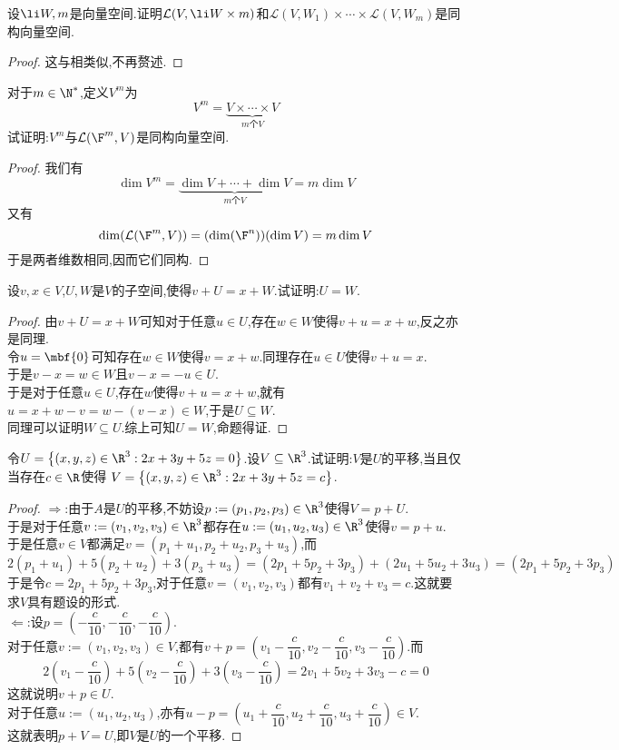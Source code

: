 \documentclass{ctexart}
\begin{document}
\begin{problem}[4.]
    设$\li W,m$是向量空间.证明$\mathcal{L}(V,\li W\times m)$和$\mathcal{L}(V,W_1)\times\cdots\times\mathcal{L}(V,W_m)$是同构向量空间.
\end{problem}
\begin{proof}
    这与相类似,不再赘述.
\end{proof}
\begin{problem}[5.]
    对于$m\in\N^*$,定义$V^m$为
    $$V^m=\underbrace{V\times\cdots\times V}_{m\text{个}V}$$
    试证明:$V^m$与$\mathcal{L}(\F^m,V)$是同构向量空间.
\end{problem}
\begin{proof}
    我们有$$\dim V^m=\underbrace{\dim V+\cdots+\dim V}_{m\text{个}V}=m\dim V$$
    又有$$\dim(\mathcal{L}(\F^m,V))=(\dim(\F^n))(\dim V)=m\dim V$$
    于是两者维数相同,因而它们同构.
\end{proof}
\begin{problem}[6.]
    设$v,x\in V$,$U,W$是$V$的子空间,使得$v+U=x+W$.试证明:$U=W$.
\end{problem}
\begin{proof}
    由$v+U=x+W$可知对于任意$u\in U$,存在$w\in W$使得$v+u=x+w$,反之亦是同理.\\
    令$u=\mbf{0}$可知存在$w\in W$使得$v=x+w$.同理存在$u\in U$使得$v+u=x$.\\
    于是$v-x=w\in W$且$v-x=-u\in U$.\\
    于是对于任意$u\in U$,存在$w$使得$v+u=x+w$,就有$u=x+w-v=w-(v-x)\in W$,于是$U\subseteq W$.\\
    同理可以证明$W\subseteq U$.综上可知$U=W$,命题得证.
\end{proof}
\begin{problem}[7.]
    令$U=\left\{(x,y,z)\in\R^3:2x+3y+5z=0\right\}$.设$V\subseteq\R^3$.试证明:$V$是$U$的平移,当且仅当存在$c\in\R$使得%
    $V=\left\{(x,y,z)\in\R^3:2x+3y+5z=c\right\}$.
\end{problem}
\begin{proof}
    $\Rightarrow$:由于$A$是$U$的平移,不妨设$p:=(p_1,p_2,p_3)\in\R^3$使得$V=p+U$.\\
    于是对于任意$v:=(v_1,v_2,v_3)\in\R^3$都存在$u:=(u_1,u_2,u_3)\in\R^3$使得$v=p+u$.\\
    于是任意$v\in V$都满足$v=(p_1+u_1,p_2+u_2,p_3+u_3)$,而
    $$2(p_1+u_1)+5(p_2+u_2)+3(p_3+u_3)=(2p_1+5p_2+3p_3)+(2u_1+5u_2+3u_3)=(2p_1+5p_2+3p_3)$$
    于是令$c=2p_1+5p_2+3p_3$,对于任意$v=(v_1,v_2,v_3)$都有$v_1+v_2+v_3=c$.这就要求$V$具有题设的形式.\\
    $\Leftarrow$:设$p=\left(-\dfrac{c}{10},-\dfrac{c}{10},-\dfrac{c}{10}\right)$.\\
    对于任意$v:=(v_1,v_2,v_3)\in V$,都有$v+p=\left(v_1-\dfrac{c}{10},v_2-\dfrac{c}{10},v_3-\dfrac{c}{10}\right)$.而
    $$2\left(v_1-\dfrac{c}{10}\right)+5\left(v_2-\dfrac{c}{10}\right)+3\left(v_3-\dfrac{c}{10}\right)=2v_1+5v_2+3v_3-c=0$$
    这就说明$v+p\in U$.\\
    对于任意$u:=(u_1,u_2,u_3)$,亦有$u-p=\left(u_1+\dfrac{c}{10},u_2+\dfrac{c}{10},u_3+\dfrac{c}{10}\right)\in V$.\\
    这就表明$p+V=U$,即$V$是$U$的一个平移.
\end{proof}
\end{document}
